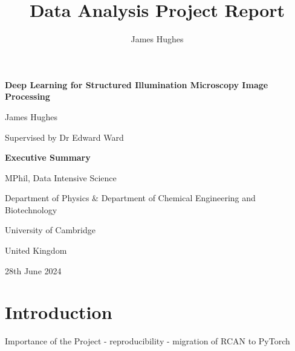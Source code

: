 \documentclass[12pt]{article}
\title{Data Analysis Project Report}
\author{James Hughes}
\begin{document}
\begin{titlepage}
    \begin{center}
        \vspace*{1cm}

        \Huge
        \textbf{Deep Learning for Structured Illumination Microscopy Image Processing}

        \vspace{0.5cm}
        \LARGE

        James Hughes

        Supervised by Dr Edward Ward

        \vspace{2cm}
        \Huge
        \textbf{Executive Summary}

        \vfill

        MPhil, Data Intensive Science

        \vspace{0.8cm}

        \Large
        Department of Physics \& Department of Chemical Engineering and Biotechnology

        University of Cambridge

        United Kingdom

        28th June 2024

    \end{center}
\end{titlepage}

\newpage

\newpage
\section{Introduction}

Importance of the Project
- reproducibility
- migration of RCAN to PyTorch
\end{document}
